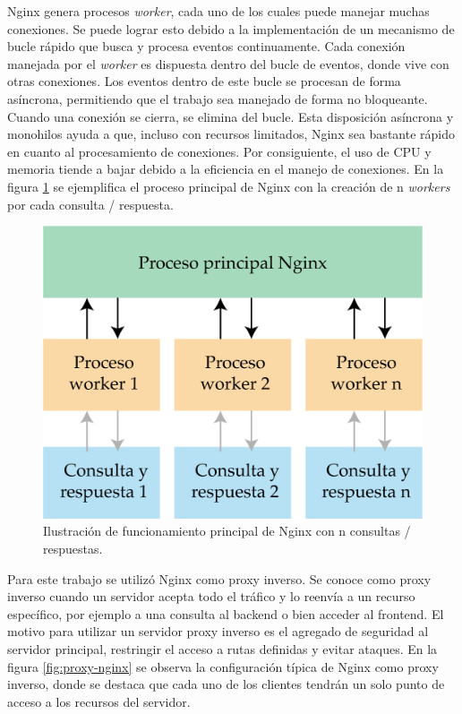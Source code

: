 Nginx genera procesos \textit{worker}, cada uno de los cuales puede manejar muchas conexiones. Se puede lograr esto debido a la implementación de un mecanismo de bucle rápido que busca y procesa eventos continuamente. Cada conexión manejada por el \textit{worker} es dispuesta dentro del bucle de eventos, donde vive con otras conexiones. Los eventos dentro de este bucle se procesan de forma asíncrona, permitiendo que el trabajo sea manejado de forma no bloqueante. Cuando una conexión se cierra, se elimina del bucle. Esta disposición asíncrona y monohilos ayuda a que, incluso con recursos limitados, Nginx sea bastante rápido en cuanto al procesamiento de conexiones. Por consiguiente, el uso de CPU y memoria tiende a bajar debido a la eficiencia en el manejo de conexiones. En la figura  \ref{fig:worker-nginx} se ejemplifica el proceso principal de Nginx con la creación de n \textit{workers} por cada consulta / respuesta.

\begin{figure}[htpb]
	\centering
	\includegraphics[scale=.7]{./Figures/worker-nginx.png}
	\caption[Proceso principal Nginx ]{Ilustración de funcionamiento principal de Nginx con n consultas / respuestas.}
	\label{fig:worker-nginx}
\end{figure}

Para este trabajo se utilizó Nginx como proxy inverso. Se conoce como proxy inverso cuando un servidor acepta todo el tráfico y lo reenvía a un recurso específico, por ejemplo a una consulta al backend o bien acceder al frontend. El motivo para utilizar un servidor proxy inverso es el agregado de seguridad al servidor principal,  restringir el acceso a rutas definidas y evitar ataques. En la figura \ref{fig:proxy-nginx}  se observa la configuración típica de Nginx como proxy inverso, donde se destaca que cada uno de los clientes tendrán un solo punto de acceso a los recursos del servidor. 

